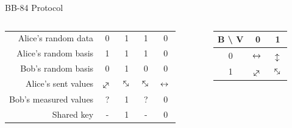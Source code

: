 \documentclass{beamer}
\newcommand{\myarrow}[1][-45]{%
  \mathrel{%
    \text{$
     \begin{tikzpicture}[baseline = -0.5ex]
       \node[inner sep=0pt,outer sep=0pt,rotate = #1] (a) at (0,0)  {$\leftrightarrow{}$};
    \end{tikzpicture}
    $}%
  }%
}%
\begin{document}
	\begin{frame}{BB-84 Protocol} %
		\begin{columns}
			\begin{column}{0.7\textwidth}
				\begin{table}
					\begin{tabular}{r | c | c | c | c  }
						Alice's random data & 0 & 1 & 1 & 0 \\
						Alice's random basis & 1 & 1 & 1 & 0 \\
						Bob's random basis & 0 & 1 & 0 & 0 \\
						Alice's sent values & $\myarrow[45]$ & $\myarrow[-45]$ & $\myarrow[-45]$ & $\myarrow[0]$ \\
						Bob's measured values & ? & 1 & ? & 0 \\
						Shared key & - & 1 & - & 0 
					\end{tabular}
				\end{table}
			\end{column}
			\vrule{}
			\begin{column}{0.3\textwidth}
				\begin{table}
					\begin{tabular}{c | c  c}
						 B \textbackslash \; V & 0 & 1 \\
						  \hline
						0 & $\myarrow[0]$ & $\myarrow[90]$ \\
						1 & $\myarrow[45]$ & $\myarrow[-45]$ \\
					\end{tabular}
	
				\end{table}

			\end{column}
		\end{columns}
	\end{frame}
\end{document}
